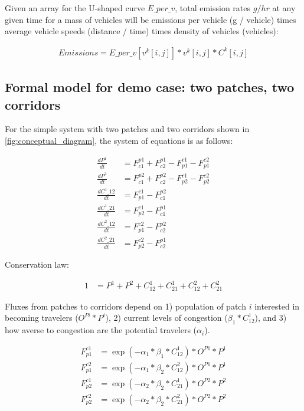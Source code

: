 \documentclass[
]{article}
\begin{document}
Given an array for the U-shaped curve \(E\_per\_v\), total emission
rates \(g / hr\) at any given time for a mass of vehicles will be
emissions per vehicle (g / vehicle) times average vehicle speeds
(distance / time) times density of vehicles (vehicles):


\begin{align*}
    Emissions = E\_{{per}\_v}[v^k[i,j]] * v^k[i,j] * C^k[i,j]
\end{align*}


\subsection{Formal model for demo case: two patches, two
corridors}\label{formal-model-for-demo-case-two-patches-two-corridors}

For the simple system with two patches and two corridors shown in
\autoref{fig:conceptual_diagram}, the system of equations is as follows:


\begin{align*}
    \frac{dP^1}{dt} &= F_{c1}^{p1} + F_{c2}^{p1} - F_{p1}^{c1} - F_{p1}^{c2} \\
    \frac{dP^2}{dt} &= F_{c1}^{p2} + F_{c2}^{p2} - F_{p2}^{c1} - F_{p2}^{c2} \\
    \frac{dC^{1}\_{12}}{dt} &= F_{p1}^{c1} - F_{c1}^{p2} \\
    \frac{dC^{1}\_{21}}{dt} &= F_{p2}^{c1} - F_{c1}^{p1} \\
    \frac{dC^{2}\_{12}}{dt} &= F_{p1}^{c2} - F_{c2}^{p2} \\
    \frac{dC^{2}\_{21}}{dt} &= F_{p2}^{c2} - F_{c2}^{p1}
\end{align*}


Conservation law:


\begin{align*}
    1 &= P^1 + P^2 + C^1_{12} + C^1_{21} + C^2_{12} + C^2_{21}
\end{align*}


Fluxes from patches to corridors depend on 1) population of patch \(i\)
interested in becoming travelers (\(O^{Pi} * P^i\)), 2) current levels
of congestion (\(\beta_1 * C^1_{12}\)), and 3) how averse to congestion
are the potential travelers (\(\alpha_i\)).


\begin{align*}
    F_{p1}^{c1} &= \exp{(-\alpha_1 * \beta_1 * C^1_{12})} * O^{P1} * P^1 \\
    F_{p1}^{c2} &= \exp{(-\alpha_1 * \beta_2 * C^2_{12})} * O^{P1} * P^1 \\
    F_{p2}^{c1} &= \exp{(-\alpha_2 * \beta_2 * C^1_{21})} * O^{P2} * P^2 \\
    F_{p2}^{c2} &= \exp{(-\alpha_2 * \beta_2 * C^2_{21})} * O^{P2} * P^2 \\
\end{align*}
\end{document}
